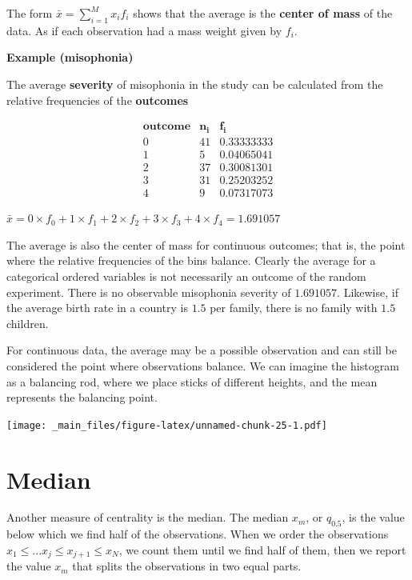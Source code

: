 \documentclass[
]{book}
\begin{document}
The form \(\bar{x}= \sum_{i = 1}^M x_i f_i\) shows that the average is the \textbf{center of mass} of the data. As if each observation had a mass weight given by \(f_i\).

\textbf{Example (misophonia)}

The average \textbf{severity} of misophonia in the study can be calculated from the relative frequencies of the \textbf{outcomes}

\[
\begin{array}{ccc}
\mathbf{outcome} & \mathbf{n_i} & \mathbf{f_i} \\
0   & 41    & 0.33333333  \\
1   & 5     & 0.04065041  \\
2   & 37    & 0.30081301  \\ 
3   & 31    & 0.25203252  \\
4   & 9     & 0.07317073   
\end{array}
\]

\(\bar{x}=0\times f_ {0}+ 1\times f_{1}+2 \times f_{2}+3 \times f_{3}+4 \times f_{4}=1.691057\)

The average is also the center of mass for continuous outcomes; that is, the point where the relative frequencies of the bins balance. Clearly the average for a categorical ordered variables is not necessarily an outcome of the random experiment. There is no observable misophonia severity of \(1.691057\). Likewise, if the average birth rate in a country is \(1.5\) per family, there is no family with \(1.5\) children.

For continuous data, the average may be a possible observation and can still be considered the point where observations balance. We can imagine the histogram as a balancing rod, where we place sticks of different heights, and the mean represents the balancing point.

\texttt{[image: \_main\_files/figure-latex/unnamed-chunk-25-1.pdf]}

\hypertarget{median}{%
\section{Median}\label{median}}

Another measure of centrality is the median. The median \(x_m\), or \(q_{0.5}\), is the value below which we find half of the observations. When we order the observations \(x_1 \leq ... x_j \leq x_{j+1} \leq x_N\), we count them until we find half of them, then we report the value \(x_m\) that splits the observations in two equal parts.
\end{document}
